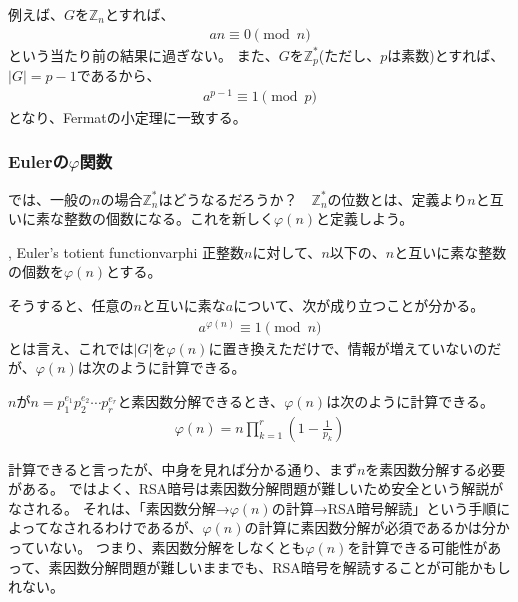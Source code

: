 例えば、$G$を$\mathbb{Z}_n$とすれば、
\begin{align*}
an \equiv 0 \pmod{n}
\end{align*}
という当たり前の結果に過ぎない。
また、$G$を$\mathbb{Z}^*_p$(ただし、$p$は素数)とすれば、$|G|=p-1$であるから、
\begin{align*}
a^{p-1} \equiv 1 \pmod{p}
\end{align*}
となり、Fermatの小定理に一致する。

\subsubsection{Eulerの$\varphi$関数}
では、一般の$n$の場合$\mathbb{Z}^*_n$はどうなるだろうか？　$\mathbb{Z}^*_n$の位数とは、定義より$n$と互いに素な整数の個数になる。これを新しく$\varphi(n)$と定義しよう。

\begin{Defi}{, Euler's totient function}{varphi}
正整数$n$に対して、$n$以下の、$n$と互いに素な整数の個数を$\varphi(n)$とする。
\end{Defi}

そうすると、任意の$n$と互いに素な$a$について、次が成り立つことが分かる。
\begin{align*}
a^{\varphi(n)} \equiv 1 \pmod{n}
\end{align*}
とは言え、これでは$|G|$を$\varphi(n)$に置き換えただけで、情報が増えていないのだが、$\varphi(n)$は次のように計算できる。

\begin{Theo}{}{}
$n$が$n=p_1^{e_1}p_2^{e_2}\cdots p_r^{e_r}$と素因数分解できるとき、$\varphi(n)$は次のように計算できる。
\begin{align*}
\varphi(n) = n \prod_{k=1}^r \left( 1 - \frac{1}{p_k} \right)
\end{align*}
\end{Theo}


計算できると言ったが、中身を見れば分かる通り、まず$n$を素因数分解する必要がある。
ではよく、RSA暗号は素因数分解問題が難しいため安全という解説がなされる。
それは、「素因数分解→$\varphi(n)$の計算→RSA暗号解読」という手順によってなされるわけであるが、$\varphi(n)$の計算に素因数分解が必須であるかは分かっていない。
つまり、素因数分解をしなくとも$\varphi(n)$を計算できる可能性があって、素因数分解問題が難しいままでも、RSA暗号を解読することが可能かもしれない。

